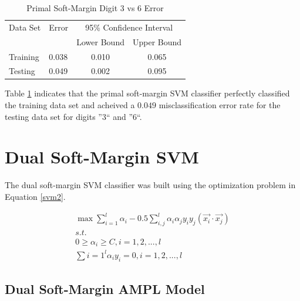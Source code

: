 \documentclass{article}
\begin{document}
\begin{table}
\caption{Primal Soft-Margin Digit 3 vs 6 Error}
\begin{center}
\begin{tabular}{llcc}
\toprule
Data Set & Error & \multicolumn{2}{c}{95\% Confidence Interval} \\
\cmidrule(r){3-4}
& & Lower Bound & Upper Bound \\
\midrule
Training & 0.038 & 0.010 & 0.065 \\
Testing & 0.049 & 0.002 & 0.095 \\
\bottomrule
\end{tabular}
\end{center}
\label{table1}
\end{table}

Table \ref{table1} indicates that the primal soft-margin SVM classifier perfectly classified the training data set and acheived a \(0.049\) misclassification error rate for the testing data set for digits ''3`` and ''6``.

\section{Dual Soft-Margin SVM}\label{model2}

The dual soft-margin SVM classifier was built using the optimization problem in Equation \ref{svm2}.

\begin{equation}
\begin{split}
\max \sum_{i=1}^l \alpha_i - 0.5 \sum_{i,j}^l \alpha_i \alpha_j y_i y_j \left( \vec{x_i} \cdot \vec{x_j} \right) \\
s.t. \\
0 \ge \alpha_i \ge C , i = 1,2,...,l \\
\sum{i=1}^l \alpha_i y_i = 0 , i = 1,2,...,l
\end{split}
\label{svm2}
\end{equation}

\subsection{Dual Soft-Margin AMPL Model}
\end{document}
